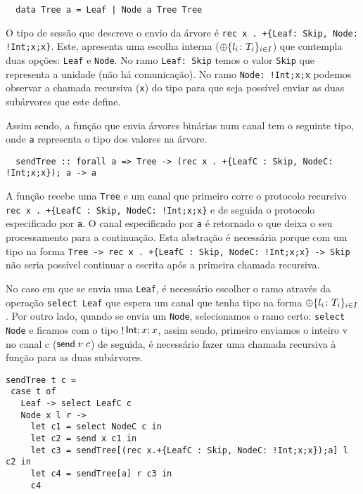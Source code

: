 \begin{lstlisting}
  data Tree a = Leaf | Node a Tree Tree
\end{lstlisting}

O tipo de sessão que descreve o envio da árvore é \lstinline"rec x . +{Leaf: Skip, Node: !Int;x;x}". Este, apresenta uma escolha interna ($\oplus\{l_i\colon T_i\}_{i\in I}$) que contempla duas opções: \lstinline"Leaf" e \lstinline"Node". No ramo \lstinline"Leaf: Skip" temos o valor \lstinline"Skip" que representa a unidade (não há comunicação). No ramo \lstinline"Node: !Int;x;x" podemos observar a chamada recursiva (\lstinline"x") do tipo para que seja possível enviar as duas subárvores que este define.

Assim sendo, a função que envia árvores binárias num canal tem o seguinte tipo, onde \lstinline|a| representa o tipo dos valores na árvore.

\begin{lstlisting}
  sendTree :: forall a => Tree -> (rec x . +{LeafC : Skip, NodeC: !Int;x;x}); a -> a
\end{lstlisting}

A função recebe uma \lstinline|Tree| e um canal que primeiro corre o protocolo recursivo \lstinline|rec x . +{LeafC : Skip, NodeC: !Int;x;x}| e de seguida o protocolo especificado por \lstinline|a|. O canal especificado por \lstinline|a| é retornado o que deixa o seu processamento para a continuação. Esta abstração é necessária porque com um tipo na forma \lstinline|Tree -> rec x . +{LeafC : Skip, NodeC: !Int;x;x} -> Skip| não seria possível continuar a escrita após a primeira chamada recursiva.

No caso em que se envia uma \lstinline"Leaf", é necessário escolher o ramo através da operação \lstinline"select Leaf" que espera um canal que tenha tipo na forma $\oplus\{l_i\colon T_i\}_{i\in I}$.
Por outro lado, quando se envia um \lstinline"Node", selecionamos o ramo certo: \lstinline"select Node" e ficamos com o tipo $\mathop!\mathsf{Int};x;x$, assim sendo, primeiro enviamos o inteiro v no canal c ($\mathsf{send}\;v\; c$) de seguida, é necessário fazer uma chamada recursiva à função para as duas subárvores.

\begin{lstlisting}
sendTree t c =
 case t of
   Leaf -> select LeafC c
   Node x l r ->
     let c1 = select NodeC c in
     let c2 = send x c1 in
     let c3 = sendTree[(rec x.+{LeafC : Skip, NodeC: !Int;x;x});a] l c2 in
     let c4 = sendTree[a] r c3 in
     c4

\end{lstlisting}

